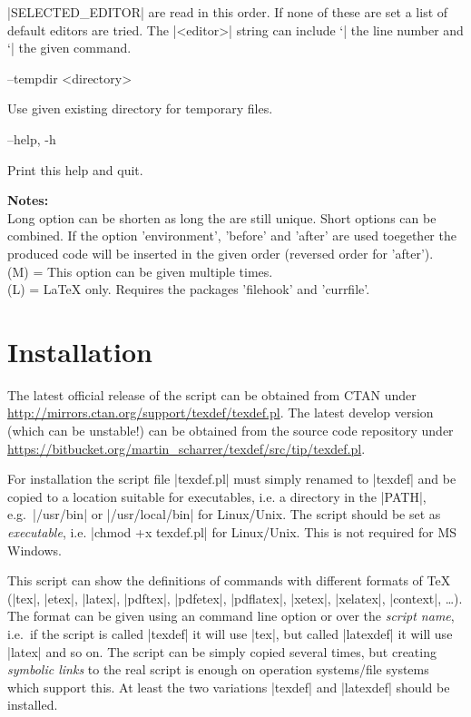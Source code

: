 \documentclass{ydoc}
\newenvironment{options}{%
    \def\cstart{\begingroup\ttfamily\par\noindent\ignorespaces}%
    \def\csep{\endgroup\begingroup\list {}{}\item \relax}%
    \def\cend{\endlist\par\medskip\endgroup\cstart}%
    \cstart
}{%
    \endgroup
}
\begin{document}
\begin{options}
                                                       |SELECTED_EDITOR| are read in this order. If none of these are set a list of default
                                                       editors are tried.  The |<editor>| string can include `|%
                                                       the line number and `|%
                                                       the given command.\cend
  --tempdir <directory>                              \csep Use given existing directory for temporary files.\cend
  --help, -h                                         \csep Print this help and quit.\cend
\end{options}

\noindent \textbf{Notes:}\\
 Long option can be shorten as long the are still unique.  Short options can be combined.
 If the option 'environment', 'before' and 'after' are used toegether the
 produced code will be inserted in the given order (reversed order for 'after').\\
 (M) = This option can be given multiple times.\\
 (L) = LaTeX only. Requires the packages 'filehook' and 'currfile'.


\section{Installation}\label{sec:install}

The latest official release of the script can be obtained from CTAN under \url{http://mirrors.ctan.org/support/texdef/texdef.pl}.
The latest develop version (which can be unstable!) can be obtained from the source code repository under 
\url{https://bitbucket.org/martin_scharrer/texdef/src/tip/texdef.pl}.

For installation the script file |texdef.pl| must simply renamed to |texdef| and be copied to a location suitable for executables,
i.e. a directory in the |PATH|, e.g.\ |/usr/bin| or |/usr/local/bin| for Linux/Unix.
The script should be set as \emph{executable}, i.e. |chmod +x texdef.pl| for Linux/Unix.
This is not required for MS Windows.

This script can show the definitions of commands with different formats of TeX
(|tex|, |etex|, |latex|, |pdftex|, |pdfetex|, |pdflatex|, |xetex|, |xelatex|, |context|, \ldots).
The format can be given using an command line option or over the \emph{script name},
i.e.\ if the script is called |texdef| it will use |tex|, but called |latexdef|
it will use |latex| and so on.
The script can be simply copied several times, but creating \emph{symbolic links}
to the real script is enough on operation systems/file systems which support
this.
At least the two variations |texdef| and |latexdef| should be installed.
\end{document}
